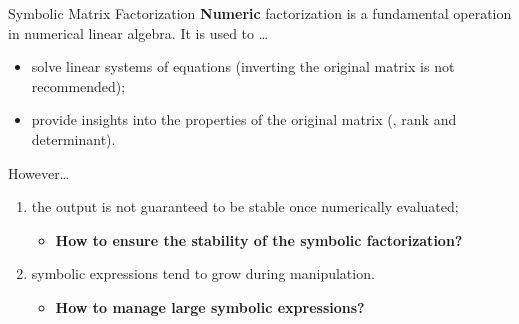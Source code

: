 \begin{frame}{Symbolic Matrix Factorization}
  \textbf{Numeric} factorization is a fundamental operation in numerical linear algebra. It is used to \dots
  \begin{itemize}
    \item solve linear systems of equations (inverting the original matrix is not recommended);
    \item provide insights into the properties of the original matrix (\ie{}, rank and determinant).
  \end{itemize}
  \vspace{1.0em}
  \vspace{1.0em}
  However\dots
  \begin{enumerate}
    \item the output is not guaranteed to be stable once numerically evaluated;
    \begin{itemize}
      \item[] \textbf{How to ensure the stability of the symbolic factorization?}
    \end{itemize}
    \item symbolic expressions tend to grow during manipulation.
    \begin{itemize}
      \item[] \textbf{How to manage large symbolic expressions?}
    \end{itemize}
  \end{enumerate}
\end{frame}

